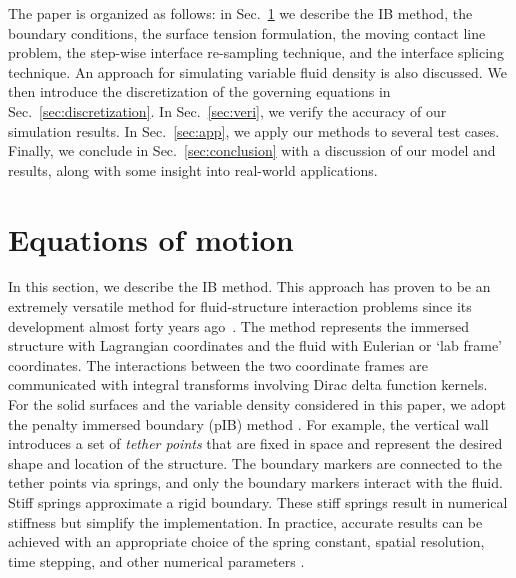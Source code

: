 \documentclass[%
 aip,
 amsmath,amssymb,
 reprint,
 floatfix
]{revtex4-1}
\begin{document}
The paper is organized as follows: in Sec.~\ref{sec:numerical} we describe the IB method, the boundary conditions, the surface tension formulation, the moving contact line problem, the step-wise interface re-sampling technique, and the interface splicing technique. An approach for simulating variable fluid density is also discussed. We then introduce the discretization of the governing equations in Sec.~\ref{sec:discretization}. In Sec.~\ref{sec:veri}, we verify the accuracy of our simulation results. In Sec.~\ref{sec:app}, we apply our methods to several test cases. Finally, we conclude in Sec.~\ref{sec:conclusion} with a discussion of our model and results, along with some insight into real-world applications.

\section{Equations of motion} \label{sec:numerical}
In this section, we describe the IB method. This approach has proven to be an extremely versatile method for fluid-structure interaction problems since its development almost forty years ago~\cite{peskin1972flow,mcqueen1997shared,arthurs1998modeling,lai2000immersed,griffith2009simulating,balboa2011staggered,devendran2012immersed,sanaei2021flight}. The method represents the immersed structure with Lagrangian coordinates and the fluid with Eulerian or `lab frame' coordinates. The interactions between the two coordinate frames are communicated with integral transforms involving Dirac delta function kernels. For the solid surfaces and the variable density considered in this paper, we adopt the penalty immersed boundary (pIB) method \cite{kim2016penalty}. For example, the vertical wall introduces a set of \textit{tether points} that are fixed in space and represent the desired shape and location of the structure. The boundary markers are connected to the tether points via springs, and only the boundary markers interact with the fluid. Stiff springs approximate a rigid boundary. These stiff springs result in numerical stiffness but simplify the implementation. In practice, accurate results can be achieved with an appropriate choice of the spring constant, spatial resolution, time stepping, and other numerical parameters \cite{kim2016penalty,sanaei2021flight}. 
\end{document}
